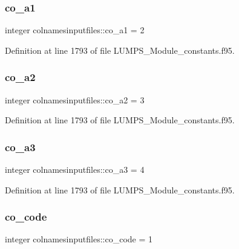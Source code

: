 \subsubsection{\texorpdfstring{co\+\_\+a1}{co\_a1}}
{\footnotesize\ttfamily integer colnamesinputfiles\+::co\+\_\+a1 = 2}



Definition at line 1793 of file L\+U\+M\+P\+S\+\_\+\+Module\+\_\+constants.\+f95.

\mbox{\label{namespacecolnamesinputfiles_a4ab300855bf4009fd3c3f2c5cd60d114}} 
\subsubsection{\texorpdfstring{co\+\_\+a2}{co\_a2}}
{\footnotesize\ttfamily integer colnamesinputfiles\+::co\+\_\+a2 = 3}



Definition at line 1793 of file L\+U\+M\+P\+S\+\_\+\+Module\+\_\+constants.\+f95.

\mbox{\label{namespacecolnamesinputfiles_a67f915a871a5baf877ec2a672756f3bd}} 
\subsubsection{\texorpdfstring{co\+\_\+a3}{co\_a3}}
{\footnotesize\ttfamily integer colnamesinputfiles\+::co\+\_\+a3 = 4}



Definition at line 1793 of file L\+U\+M\+P\+S\+\_\+\+Module\+\_\+constants.\+f95.

\mbox{\label{namespacecolnamesinputfiles_a8126a74952ead81f96e91826ab641bed}} 
\subsubsection{\texorpdfstring{co\+\_\+code}{co\_code}}
{\footnotesize\ttfamily integer colnamesinputfiles\+::co\+\_\+code = 1}



